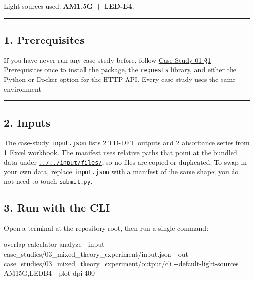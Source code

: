 \documentclass[
  11pt,
]{article}
\newenvironment{Shaded}{}{}
\newcommand{\AttributeTok}[1]{\textcolor[rgb]{0.49,0.56,0.16}{#1}}
\newcommand{\ExtensionTok}[1]{#1}
\newcommand{\NormalTok}[1]{#1}
\begin{document}
Light sources used: \textbf{AM1.5G + LED-B4}.

\begin{center}\rule{0.5\linewidth}{0.5pt}\end{center}

\hypertarget{1-prerequisites}{
\subsection{1. Prerequisites}\label{1-prerequisites}}

If you have never run any case study before, follow
\href{https://github.com/pinarsyt/overlap-calculator/blob/main/case_studies/01_theoretical_only/README.md\#1-prerequisites}{Case
Study 01 §1 Prerequisites} once to install the package, the
\texttt{requests} library, and either the Python or Docker option for
the HTTP API. Every case study uses the same environment.

\begin{center}\rule{0.5\linewidth}{0.5pt}\end{center}

\hypertarget{2-inputs}{
\subsection{2. Inputs}\label{2-inputs}}

The case-study \texttt{input.json} lists 2 TD-DFT outputs and 2
absorbance series from 1 Excel workbook. The manifest uses relative
paths that point at the bundled data under
\href{https://github.com/pinarsyt/overlap-calculator/blob/main/input/files}{\texttt{../../input/files/}},
so no files are copied or duplicated. To swap in your own data, replace
\texttt{input.json} with a manifest of the same shape; you do not need
to touch \texttt{submit.py}.

\hypertarget{3-run-with-the-cli}{
\subsection{3. Run with the CLI}\label{3-run-with-the-cli}}

Open a terminal at the repository root, then run a single command:

\begin{Shaded}
\begin{Highlighting}[]
\ExtensionTok{overlap{-}calculator}\NormalTok{ analyze }\AttributeTok{{-}{-}input}\NormalTok{ case\_studies/03\_mixed\_theory\_experiment/input.json }\AttributeTok{{-}{-}out}\NormalTok{ case\_studies/03\_mixed\_theory\_experiment/output/cli }\AttributeTok{{-}{-}default{-}light{-}sources}\NormalTok{ AM15G,LEDB4 }\AttributeTok{{-}{-}plot{-}dpi}\NormalTok{ 400}
\end{Highlighting}
\end{Shaded}
\end{document}
